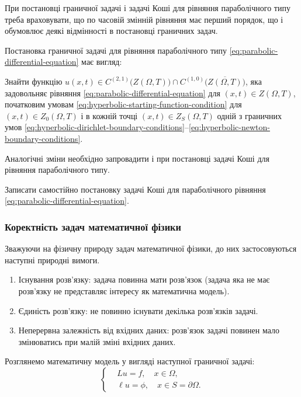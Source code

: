 При постановці граничної задачі і задачі Коші для рівняння параболічного типу треба враховувати, що по часовій змінній рівняння має перший порядок, що і обумовлює деякі відмінності в постановці граничних задач. \medskip

Постановка граничної задачі для рівняння параболічного типу \eqref{eq:parabolic-differential-equation} має вигляд: \medskip

Знайти функцію $u(x, t) \in C^{(2, 1)} \Big( Z(\Omega, T) \Big) \cap C^{(1, 0)} \Big( \overline {Z(\Omega, T)} \Big)$, яка задовольняє рівняння \eqref{eq:parabolic-differential-equation} для $(x, t) \in Z(\Omega, T)$, початковим умовам \eqref{eq:hyperbolic-starting-function-condition} для $(x, t) \in Z_0(\Omega, T)$ і в
кожній точці $(x, t) \in Z_S(\Omega, T)$ одній з граничних умов \eqref{eq:hyperbolic-dirichlet-boundary-conditions}--\eqref{eq:hyperbolic-newton-boundary-conditions}. \medskip

Аналогічні зміни необхідно запровадити і при постановці задачі Коші для рівняння параболічного типу.

\begin{exercise}
    Записати самостійно постановку задачі Коші для параболічного рівняння \eqref{eq:parabolic-differential-equation}.
\end{exercise}

\subsubsection{Коректність задач математичної фізики}

Зважуючи на фізичну природу задач математичної фізики, до них застосовуються наступні природні вимоги.
\begin{enumerate}
    \item Існування розв'язку: задача повинна мати розв'язок (задача яка не має розв'язку не представляє інтересу як математична модель).
    \item Єдиність розв’язку: не повинно існувати декілька розв'язків задачі.
    \item Неперервна залежність від вхідних даних: розв'язок задачі повинен мало змінюватись при малій зміні вхідних даних.
\end{enumerate}

Розглянемо математичну модель у вигляді наступної граничної задачі:
\begin{equation}
    \label{eq:boundary-problem}
    \left\{
        \begin{aligned}
            & L u = f, \quad x \in \Omega, \\
            & \ell u = \phi, \quad x \in S = \partial \Omega.
        \end{aligned}
    \right.
\end{equation}

